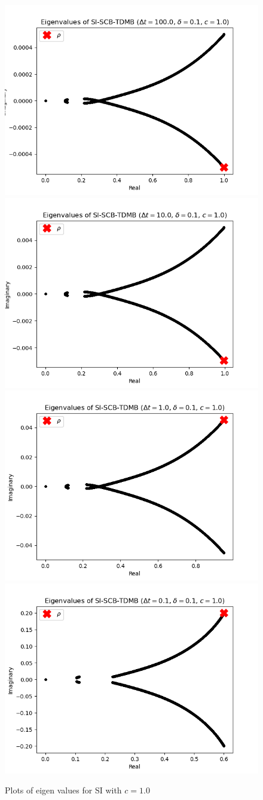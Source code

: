 \begin{figure}
    \includegraphics[width=.24\textwidth]{appendix/eig_plots/si/c1/mfp0.1dt100.0c1.0.png}
    \includegraphics[width=.24\textwidth]{appendix/eig_plots/si/c1/mfp0.1dt10.0c1.0.png}
    \includegraphics[width=.24\textwidth]{appendix/eig_plots/si/c1/mfp0.1dt1.0c1.0.png}
    \includegraphics[width=.24\textwidth]{appendix/eig_plots/si/c1/mfp0.1dt0.1c1.0.png}
    
    \caption{Plots of eigen values for SI with $c=1.0$}
    \label{appendix:si1}
\end{figure}